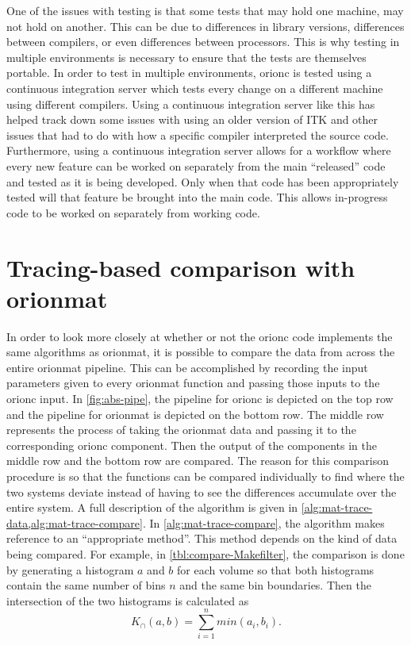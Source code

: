 One of the issues with testing is that some tests that may hold
one machine, may not hold on another. This can be due to
differences in library versions, differences between compilers, or
even differences between processors. This is why testing in
multiple environments is necessary to ensure that the tests are
themselves portable. In order to test in multiple environments,
\gls{orionc} is tested using a continuous integration server which
tests every change on a different machine using different
compilers. Using a continuous integration server like this has
helped track down some issues with using an older version of ITK
and other issues that had to do with how a specific compiler
interpreted the source code.
Furthermore, using a continuous integration server allows for a
workflow where every new feature can be worked on separately from
the main ``released'' code and tested as it is being developed.
Only when that code has been appropriately tested will that
feature be brought into the main code. This allows in-progress
code to be worked on separately from working code.

\section{Tracing-based comparison with \gls{orionmat}}

In order to look more closely at whether or not the \gls{orionc}
code implements the same algorithms as \gls{orionmat}, it is
possible to compare the data from across the entire \gls{orionmat}
pipeline. This can be accomplished by recording the input
parameters given to every \gls{orionmat} function and passing
those inputs to the \gls{orionc} input. In \cref{fig:abs-pipe},
the pipeline for \gls{orionc} is depicted on the top row and the
pipeline for \gls{orionmat} is depicted on the bottom row. The
middle row represents the process of taking the \gls{orionmat}
data and passing it to the corresponding \gls{orionc} component.
Then the output of the components in the middle row and the bottom
row are compared. The reason for this comparison procedure is so
that the functions can be compared individually to find where the
two systems deviate instead of having to see the differences
accumulate over the entire system. A full description of the
algorithm is given in
\cref{alg:mat-trace-data,alg:mat-trace-compare}. In
\cref{alg:mat-trace-compare}, the algorithm makes reference to an
``appropriate method''. This method depends on the kind of data being
compared. For example, in \cref{tbl:compare-Makefilter}, the
comparison is done by generating a histogram \(a\) and \(b\) for
each volume so that both histograms contain the same number of
bins \(n\) and the same bin boundaries. Then the intersection of the two
histograms is calculated as
\begin{equation}
 K_{\cap}(a, b) = \sum_{i = 1}^{n} min( a_i, b_i ).
\end{equation}

